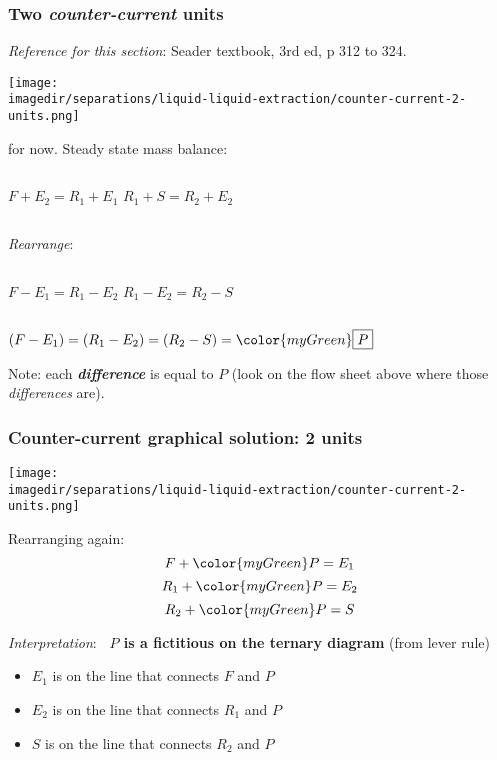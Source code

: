 \begin{frame}\frametitle{Two \emph{counter-current} units}
	\emph{Reference for this section}: {\color{myOrange}Seader textbook, 3rd ed, p 312 to 324.}
	\begin{center}
		\texttt{[image: \\imagedir/separations/liquid-liquid-extraction/counter-current-2-units.png]}
	\end{center}
	\textbf{{\color{myGreen}{Consider $N=2$ stages}}} for now. Steady state mass balance:
	\begin{center}
		\begin{columns}[t]
				$F + E_2 = R_1 + E_1$
				$R_1 + S = R_2 + E_2$
		\end{columns}
	\end{center}
	\emph{Rearrange}:
	\begin{center}		
		\begin{columns}[t]
				$F - E_1 = R_1 - E_2$
				$R_1 - E_2 = R_2 - S$
		\end{columns}
		\vspace{12pt}
		$(F - E_1)  =  (R_1 - E_2) = (R_2 - S) = {\color{myGreen}\fbox{$P$}}$
	\end{center}
	Note: each \textbf{\emph{difference}} is equal to {\color{myGreen}$P$} (look on the flow sheet above where those \emph{differences} are).
\end{frame}

\begin{frame}\frametitle{Counter-current graphical solution: 2 units}
	\begin{center}
		\texttt{[image: \\imagedir/separations/liquid-liquid-extraction/counter-current-2-units.png]}
	\end{center}
		
	Rearranging again:
	\[	F + {\color{myGreen}P} = E_1 \]
	\[	R_1 + {\color{myGreen}P} = E_2 \]
	\[	R_2 + {\color{myGreen}P} = S \]
		
	\emph{Interpretation}: \textbf{~{\color{myGreen}$P$} is a fictitious {\color{purple}{operating point}} on the ternary diagram} (from lever rule)
	\vspace{6pt}
	\begin{itemize}
		\item	$E_1$ is on the line that connects $F$ and {\color{myGreen}$P$}
		\item	$E_2$ is on the line that connects $R_1$ and {\color{myGreen}$P$}
		\item	$S$ is on the line that connects $R_2$ and {\color{myGreen}$P$}
	\end{itemize}
\end{frame}

